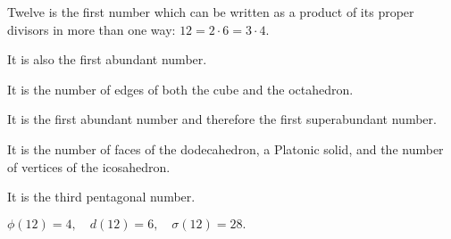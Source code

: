 Twelve is the first number which can be written as a product of its proper divisors
in more than one way: $ 12=2\cdot 6= 3\cdot 4. $
\par
It is also the first abundant number.
\par
It is the number of edges of both the cube and the octahedron.
\par
It is the first abundant number and therefore the first
superabundant number.
\par
It is the number of faces of the dodecahedron, a Platonic solid,
and the number of vertices of the icosahedron.
\par
It is the third pentagonal number.
\par
$ \phi(12)=4, \quad d(12)=6, \quad \sigma(12)=28 . $